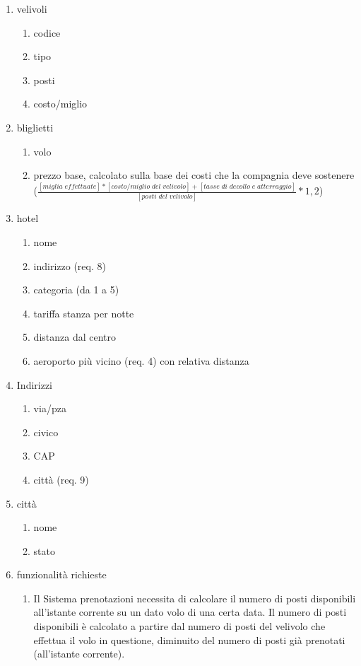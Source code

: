 \documentclass[a4paper,12pt]{report}
\begin{document}
\begin{enumerate}[label=\arabic*.]
      \newpage

      \item velivoli
      \begin{enumerate}[label*=\arabic*.]
          \item codice
          \item tipo
          \item posti
          \item costo/miglio
      \end{enumerate}
      \item bliglietti
      \begin{enumerate}[label*=\arabic*.]
          \item volo
          \item prezzo base, calcolato sulla base dei costi che la compagnia deve sostenere \\
            ($\frac{[miglia\;effettuate]*[costo/miglio\;del\;velivolo] + [tasse\;di\;decollo\;e\;atterraggio]}{[posti\;del\;velivolo]} * 1,2$)
      \end{enumerate}
      \item hotel
      \begin{enumerate}[label*=\arabic*.]
          \item nome
          \item indirizzo (req. 8)
          \item categoria (da 1 a 5)
          \item tariffa stanza per notte
          \item distanza dal centro
          \item aeroporto più vicino (req. 4) con relativa distanza
      \end{enumerate}
      \item Indirizzi
      \begin{enumerate}[label*=\arabic*.]
          \item via/pza
          \item civico
          \item CAP
          \item città (req. 9)
      \end{enumerate}
      \item città
      \begin{enumerate}[label*=\arabic*.]
          \item nome
          \item stato
      \end{enumerate}
      \item funzionalità richieste
      \begin{enumerate}[label*=\arabic*.]
          \item Il Sistema prenotazioni necessita di calcolare il numero di posti disponibili all'istante corrente su un dato volo di una certa data. Il numero di posti disponibili è calcolato a
                partire dal numero di posti del velivolo che effettua il volo in questione, diminuito del numero di posti già prenotati (all’istante corrente).


\end{enumerate}
\end{enumerate}
\end{document}
